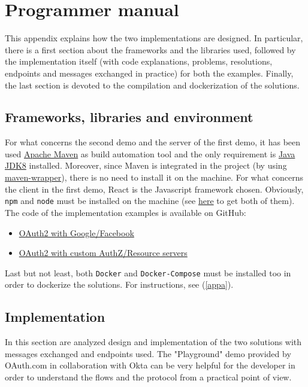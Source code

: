 \chapter{Programmer manual}
This appendix explains how the two implementations are designed. In particular, there is a first section about the frameworks and the libraries used, followed by the implementation itself (with code explanations, problems, resolutions, endpoints and messages exchanged in practice) for both the examples. Finally, the last section is devoted to the compilation and dockerization of the solutions.

\minitoc

\section{Frameworks, libraries and environment}
For what concerns the second demo and the server of the first demo, it has been used \href{https://maven.apache.org/}{Apache Maven} as build automation tool and the only requirement is \href{https://www.oracle.com/java/technologies/javase/javase-jdk8-downloads.html}{Java JDK8} installed. Moreover, since Maven is integrated in the project (by using \href{https://github.com/takari/maven-wrapper}{maven-wrapper}), there is no need to install it on the machine.
For what concerns the client in the first demo, React is the Javascript framework chosen. Obviously, \texttt{npm} and \texttt{node} must be installed on the machine (see \href{https://www.npmjs.com/get-npm}{here} to get both of them). 
The code of the implementation examples is available on GitHub:

\begin{itemize}
    \item \href{https://github.com/nopesir/oauth-hw-security}{OAuth2 with Google/Facebook}
    \item \href{https://github.com/nopesir/oauth-hw-security-custom}{OAuth2 with custom AuthZ/Resource servers}
\end{itemize}

Last but not least, both \texttt{Docker} and \texttt{Docker-Compose} must be installed too in order to dockerize the solutions. For instructions, see (\ref{appa}).

\section{Implementation}
In this section are analyzed design and implementation of the two solutions with messages exchanged and endpoints used. The "Playground" demo provided by OAuth.com in collaboration with Okta \cite{playgr} can be very helpful for the developer in order to understand the flows and the protocol from a practical point of view. 

